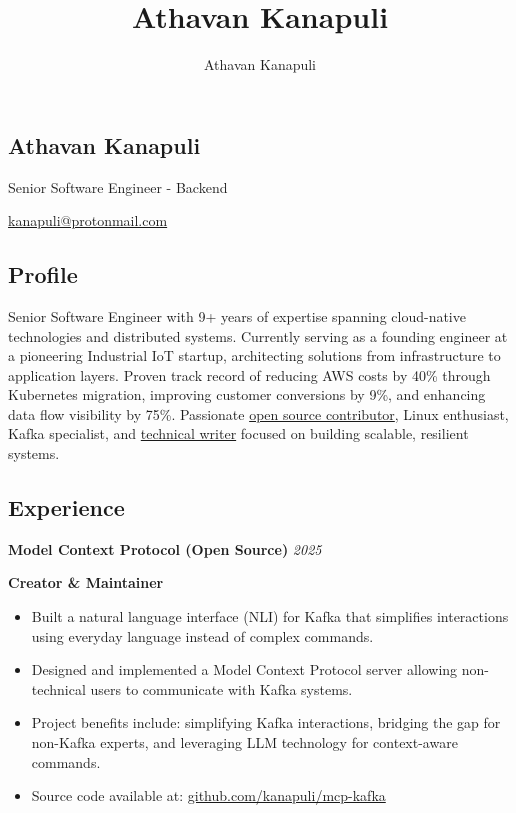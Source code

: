 \documentclass[11pt, oneside]{article}
\title{Athavan Kanapuli}
\author{Athavan Kanapuli}
\begin{document}
\begin{center}
\section*{Athavan Kanapuli}
Senior Software Engineer - Backend 

\href{kanapuli@protonmail.com}{kanapuli@protonmail.com}
\end{center}

\subsection*{Profile}

Senior Software Engineer with 9+ years of expertise spanning cloud-native technologies and distributed systems. Currently serving as a founding engineer at a pioneering Industrial IoT startup, architecting solutions from infrastructure to application layers. Proven track record of reducing AWS costs by 40\% through Kubernetes migration, improving customer conversions by 9\%, and enhancing data flow visibility by 75\%. Passionate \href{https://github.com/kanapuli}{open source contributor}, Linux enthusiast, Kafka specialist, and \href{https://kanapuli.github.io}{technical writer} focused on building scalable, resilient systems.

\medskip
\subsection*{Experience}

\textbf{Model Context Protocol (Open Source)}
\hfill
\textit{2025}

\textbf{Creator \& Maintainer}

\begin{itemize}
  \item Built a natural language interface (NLI) for Kafka that simplifies interactions using everyday language instead of complex commands.
  \item Designed and implemented a Model Context Protocol server allowing non-technical users to communicate with Kafka systems.
  \item Project benefits include: simplifying Kafka interactions, bridging the gap for non-Kafka experts, and leveraging LLM technology for context-aware commands.
  \item Source code available at: \href{https://github.com/kanapuli/mcp-kafka}{github.com/kanapuli/mcp-kafka}
\end{itemize}
\end{document}
